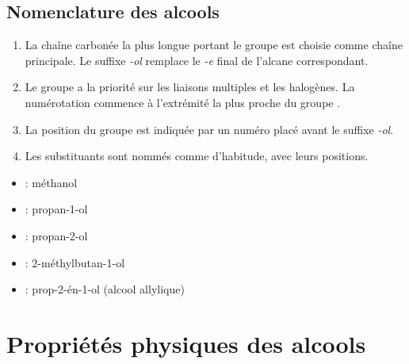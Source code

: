 \begin{illus}
\end{illus}

\begin{illus}
\end{illus}

\begin{illus}
\end{illus}

\subsection{Nomenclature des alcools}

\begin{loi}
\begin{enumerate}
\item La chaîne carbonée la plus longue portant le groupe  est choisie comme chaîne principale. Le suffixe \textit{-ol} remplace le \textit{-e} final de l'alcane correspondant.
\item Le groupe  a la priorité sur les liaisons multiples et les halogènes. La numérotation commence à l'extrémité la plus proche du groupe .
\item La position du groupe  est indiquée par un numéro placé avant le suffixe \textit{-ol}.
\item Les substituants sont nommés comme d'habitude, avec leurs positions.
\end{enumerate}
\end{loi}

\begin{exemple}
\begin{itemize}
\item {} : méthanol
\item {} : propan-1-ol
\item {} : propan-2-ol
\item {} : 2-méthylbutan-1-ol
\item {} : prop-2-én-1-ol (alcool allylique)
\end{itemize}
\end{exemple}

\section{Propriétés physiques des alcools}


